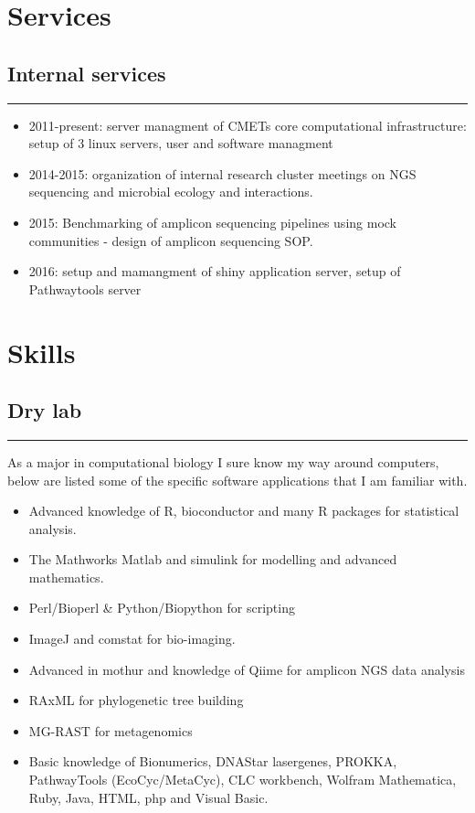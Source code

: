 \documentclass[a4paper,11pt,oneside]{article}
\begin{document}
\section*{Services}

\subsection*{Internal services}
\rule{\textwidth}{1pt}
\begin{itemize}
	\item 2011-present: server managment of CMETs core computational infrastructure: setup of 3 linux servers, user and software managment
	\item 2014-2015: organization of internal research cluster meetings on NGS sequencing and microbial ecology and interactions.
	\item 2015: Benchmarking of amplicon sequencing pipelines using mock communities - design of amplicon sequencing SOP.
	\item 2016: setup and mamangment of shiny application server, setup of Pathwaytools server
\end{itemize}


\section*{Skills}
\subsection*{Dry lab}
\rule{\textwidth}{1pt}
As a major in computational biology I sure know my way around computers, below are listed some of the specific software applications that I am familiar with.
\begin{itemize}
	\item Advanced knowledge of R, bioconductor and many R packages for statistical analysis.
	\item The Mathworks Matlab and simulink for modelling and advanced mathematics.
	\item Perl/Bioperl \& Python/Biopython for scripting
	\item ImageJ and comstat for bio-imaging.
  \item Advanced in mothur and knowledge of Qiime for amplicon NGS data analysis
  \item RAxML for phylogenetic tree building
  \item MG-RAST for metagenomics
	\item Basic knowledge of Bionumerics, DNAStar lasergenes, PROKKA, PathwayTools (EcoCyc/MetaCyc), CLC workbench, Wolfram Mathematica,  Ruby, Java, HTML, php and Visual Basic.
\end{itemize}
\end{document}
